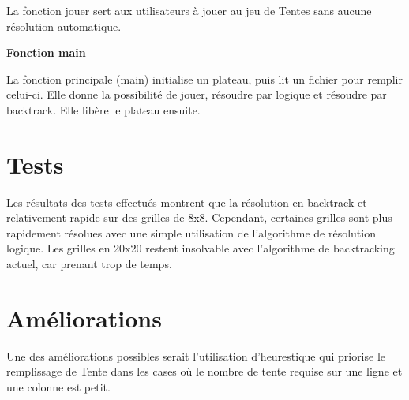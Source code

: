 \documentclass{article}
\begin{document}
La fonction jouer sert aux utilisateurs à jouer au jeu de Tentes sans aucune résolution automatique.

\textbf{Fonction main}

La fonction principale (main) initialise un plateau, puis lit un fichier pour remplir celui-ci. Elle donne la possibilité de jouer, résoudre par logique et résoudre par backtrack. Elle libère le plateau ensuite.

\section*{Tests}

Les résultats des tests effectués montrent que la résolution en backtrack et relativement rapide sur des grilles de 8x8. Cependant, certaines grilles sont plus rapidement résolues avec une simple utilisation de l'algorithme de résolution logique. Les grilles en 20x20 restent insolvable avec l'algorithme de backtracking actuel, car prenant trop de temps.

\section*{Améliorations}

Une des améliorations possibles serait l'utilisation d'heurestique qui priorise le remplissage de Tente dans les cases où le nombre de tente requise sur une ligne et une colonne est petit.
\end{document}
